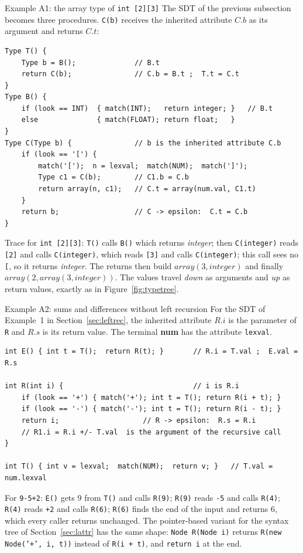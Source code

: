 \documentclass[11pt,a4paper]{article}
\begin{document}
\begin{examplebox}{Example A1: the array type of \texttt{int [2][3]}}
The SDT of the previous subsection becomes three procedures. \texttt{C(b)} receives the inherited attribute $C.b$ as its argument and returns $C.t$:
\begin{lstlisting}
Type T() {
    Type b = B();              // B.t
    return C(b);               // C.b = B.t ;  T.t = C.t
}
Type B() {
    if (look == INT)  { match(INT);   return integer; }   // B.t
    else              { match(FLOAT); return float;   }
}
Type C(Type b) {               // b is the inherited attribute C.b
    if (look == '[') {
        match('[');  n = lexval;  match(NUM);  match(']');
        Type c1 = C(b);        // C1.b = C.b
        return array(n, c1);   // C.t = array(num.val, C1.t)
    }
    return b;                  // C -> epsilon:  C.t = C.b
}
\end{lstlisting}
Trace for \texttt{int [2][3]}: \texttt{T()} calls \texttt{B()} which returns \textit{integer}; then \texttt{C(integer)} reads \texttt{[2]} and calls \texttt{C(integer)}, which reads \texttt{[3]} and calls \texttt{C(integer)}; this call sees no \texttt{[}, so it returns \textit{integer}. The returns then build $\mathit{array}(3,\mathit{integer})$ and finally $\mathit{array}(2,\mathit{array}(3,\mathit{integer}))$. The values travel \emph{down} as arguments and \emph{up} as return values, exactly as in Figure~\ref{fig:typetree}.
\end{examplebox}

\begin{examplebox}{Example A2: sums and differences without left recursion}
For the SDT of Example~1 in Section~\ref{sec:leftrec}, the inherited attribute $R.i$ is the parameter of \texttt{R} and $R.s$ is its return value. The terminal \textbf{num} has the attribute \texttt{lexval}.
\begin{lstlisting}
int E() { int t = T();  return R(t); }       // R.i = T.val ;  E.val = R.s

int R(int i) {                               // i is R.i
    if (look == '+') { match('+'); int t = T(); return R(i + t); }
    if (look == '-') { match('-'); int t = T(); return R(i - t); }
    return i;                    // R -> epsilon:  R.s = R.i
    // R1.i = R.i +/- T.val  is the argument of the recursive call
}

int T() { int v = lexval;  match(NUM);  return v; }   // T.val = num.lexval
\end{lstlisting}
For \texttt{9-5+2}: \texttt{E()} gets $9$ from \texttt{T()} and calls \texttt{R(9)}; \texttt{R(9)} reads \texttt{-5} and calls \texttt{R(4)}; \texttt{R(4)} reads \texttt{+2} and calls \texttt{R(6)}; \texttt{R(6)} finds the end of the input and returns $6$, which every caller returns unchanged. The pointer-based variant for the syntax tree of Section~\ref{sec:lattr} has the same shape: \texttt{Node R(Node i)} returns \texttt{R(new Node('+', i, t))} instead of \texttt{R(i + t)}, and \texttt{return i} at the end.
\end{examplebox}
\end{document}
